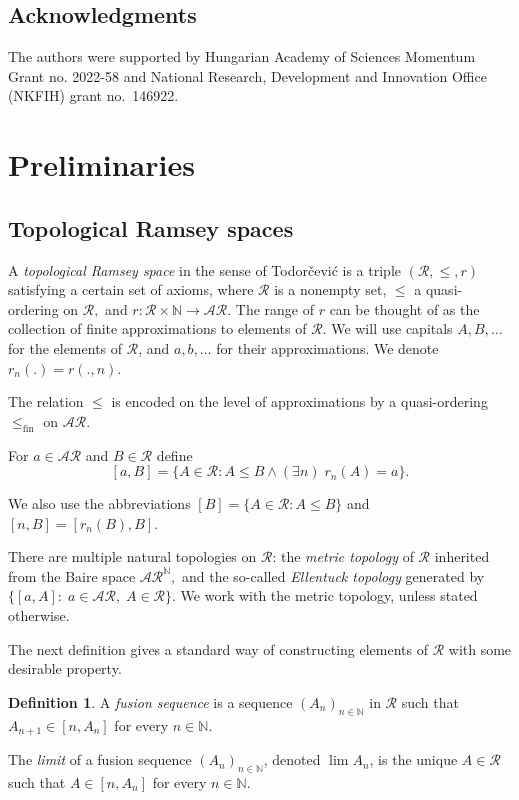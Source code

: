 \documentclass[11pt]{amsart}
\newcommand{\N}{\mathbb{N}}
\theoremstyle{definition}
\newtheorem{definition}[theorem]{Definition}
\numberwithin{equation}{section}
\newcommand{\fA}{\mathcal{A}}
\newcommand{\fR}{\mathcal{R}}
\begin{document}
	
	\subsection*{Acknowledgments} 
	The authors were supported by Hungarian Academy of Sciences Momentum Grant no. 2022-58 and National Research, Development and Innovation Office (NKFIH) grant no.~146922.
	
	\section{Preliminaries}
	\label{s:prel}

	
	\subsection{Topological Ramsey spaces}
	
	
	
	
	
	A \emph{topological Ramsey space} in the sense of Todor\v{c}evi\'c \cite{ramseyspaces} is a triple $(\mathcal{R},\le,r)$ satisfying a certain set of axioms, where $\mathcal{R}$ is a nonempty set, $\le$ a quasi-ordering on $\mathcal{R},$ and $r:\mathcal{R}\times\N\to\mathcal{AR}$. The range of $r$ can be thought of as the collection of finite approximations to elements of $\mathcal{R}$. We will use capitals $A,B,\ldots$ for the elements of $\mathcal{R}$, and $a,b,\ldots$ for their approximations. We denote $r_n(.)=r(.,n)$.
	
	The relation $\le$ is encoded on the level of approximations by a quasi-ordering $\le_{\text{fin}}$ on $\mathcal{AR}$.
	
	For $a\in\mathcal{AR}$ and $B\in\mathcal{R}$ define 
	$$[a,B]=\{A\in\mathcal{R}:A\le B \wedge (\exists n)\; r_n(A)=a\}.$$
	
	We also use the abbreviations $[B]=\{A\in\mathcal{R}:A\le B \}$ and $[n,B]=[r_n(B),B].$
	
	There are multiple natural topologies on $\fR$: the \emph{metric topology} of $\fR$ inherited from the Baire space $\fA\fR^\N,$ and the so-called \emph{Ellentuck topology} generated by $\{[a,A]:\; a\in\fA\fR,\; A\in\fR\}.$ We work with the metric topology, unless stated otherwise.
	
	
	
	The next definition gives a standard way of constructing elements of $\fR$ with some desirable property.
	
	\begin{definition}
		A \emph{fusion sequence} is a sequence $(A_n)_{n\in \N}$ in $\fR$ such that $A_{n+1}\in [n,A_n]$ for every $n\in\N.$
		
		The \emph{limit} of a fusion sequence $(A_n)_{n\in\N}$, denoted $\lim A_n$, is the unique $A\in\fR$ such that $A\in[n,A_n]$ for every $n\in\N.$ 
	\end{definition}
	
\end{document}
